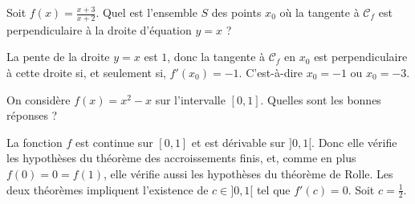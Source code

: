 \begin{question}
Soit $\displaystyle f(x)=\frac{x+3}{x+2}$. Quel est l'ensemble $S$ des points $x_0$ où la tangente à $\mathscr{C}_f$ est perpendiculaire à la droite d'équation $y=x$ ?
\begin{answers}  
\end{answers}
\begin{explanations}
La pente de la droite $y=x$ est $1$, donc la tangente à $\mathscr{C}_f$ en $x_0$ est perpendiculaire à cette droite si, et seulement si, $f'(x_0)=-1$. C'est-à-dire $x_0=-1$ ou $x_0=-3$.
\end{explanations}
\end{question}




\begin{question}
On considère $\displaystyle f(x)=x^2-x$ sur l'intervalle $[0,1]$. Quelles sont les bonnes réponses ?
\begin{answers}  
\end{answers}
\begin{explanations}
La fonction $f$ est continue sur $[0,1]$ et est dérivable sur $]0,1[$. Donc elle vérifie les hypothèses du théorème des accroissements finis, et, comme en plus $f(0)=0=f(1)$, elle vérifie aussi les hypothèses du théorème de Rolle. Les deux théorèmes impliquent l'existence de $c\in ]0,1[$ tel que $f'(c)=0$. Soit $\displaystyle c=\frac{1}{2}$.
\end{explanations}
\end{question}



